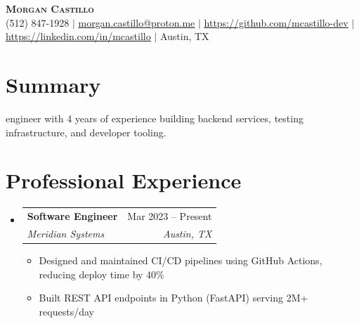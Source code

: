 \documentclass[letterpaper,11pt]{article}
\makeatletter
\newcommand{\resumeItem}[1]{\item\small{{#1 \vspace{-2pt}}}}
\newcommand{\resumeSubheading}[4]{
  \vspace{-2pt}\item
    \begin{tabular*}{0.97\textwidth}[t]{l@{\extracolsep{\fill}}r}
      \textbf{#1} & #2 \\
      \textit{\small#3} & \textit{\small #4} \\
    \end{tabular*}\vspace{-7pt}
}
\newcommand{\resumeSubHeadingListStart}{\begin{itemize}[leftmargin=0.15in, label={}]}
\newcommand{\resumeSubHeadingListEnd}{\end{itemize}}
\newcommand{\resumeItemListStart}{\begin{itemize}}
\newcommand{\resumeItemListEnd}{\end{itemize}\vspace{-5pt}}
\makeatother
\begin{document}
\begin{center}
\textbf{\Huge \scshape Morgan Castillo} \\ \vspace{1pt}
\small (512) 847-1928 $|$ \href{mailto:morgan.castillo@proton.me}{\underline{morgan.castillo@proton.me}} $|$ \href{https://github.com/mcastillo-dev}{\underline{https://github.com/mcastillo-dev}} $|$ \href{https://linkedin.com/in/mcastillo}{\underline{https://linkedin.com/in/mcastillo}} $|$ Austin, TX
\end{center}


\section{Summary}
\smallSoftware engineer with 4 years of experience building backend services, testing infrastructure, and developer tooling.





\section{Professional Experience}
\resumeSubHeadingListStart


  \resumeSubheading

    {Software Engineer}{Mar 2023 -- Present}
    {Meridian Systems}{Austin, TX}

    \resumeItemListStart


      \resumeItem{Designed and maintained CI/CD pipelines using GitHub Actions, reducing deploy time by 40\%}


      \resumeItem{Built REST API endpoints in Python (FastAPI) serving 2M+ requests/day}


    \resumeItemListEnd



\resumeSubHeadingListEnd
\end{document}
